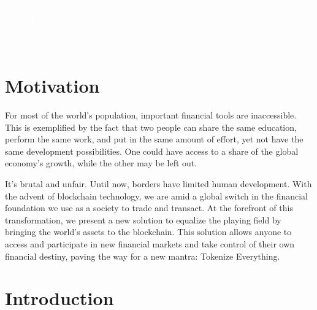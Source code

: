 \documentclass{article}
\begin{document}
\begin{sloppypar}

\begin{titlepage}
\sffamily\selectfont
\centering
\vspace*{7cm}
{}\\[5\baselineskip]
\textcolor{white}{
{\Huge Synthetic Assets on Cardano}\\[2\baselineskip]
{\Large Indigo Laboratories, Inc.}\\[0.5\baselineskip]
{\large info@indigo-labs.io}\\[3\baselineskip]
{\large November 2022, v1.0.1}
}
\end{titlepage}

\tableofcontents

\hypertarget{motivation}{%
\section{Motivation}\label{motivation}}

For most of the world's population, important financial tools are
inaccessible. This is exemplified by the fact that two people can share
the same education, perform the same work, and put in the same amount of
effort, yet not have the same development possibilities. One could have
access to a share of the global economy's growth, while the other may be
left out.

It's brutal and unfair. Until now, borders have limited human
development. With the advent of blockchain technology, we are amid a
global switch in the financial foundation we use as a society to trade
and transact. At the forefront of this transformation, we present a new
solution to equalize the playing field by bringing the world's assets to
the blockchain. This solution allows anyone to access and participate in
new financial markets and take control of their own financial destiny,
paving the way for a new mantra: Tokenize Everything.

\hypertarget{introduction}{%
\section{Introduction}\label{introduction}}


\end{sloppypar}
\end{document}
